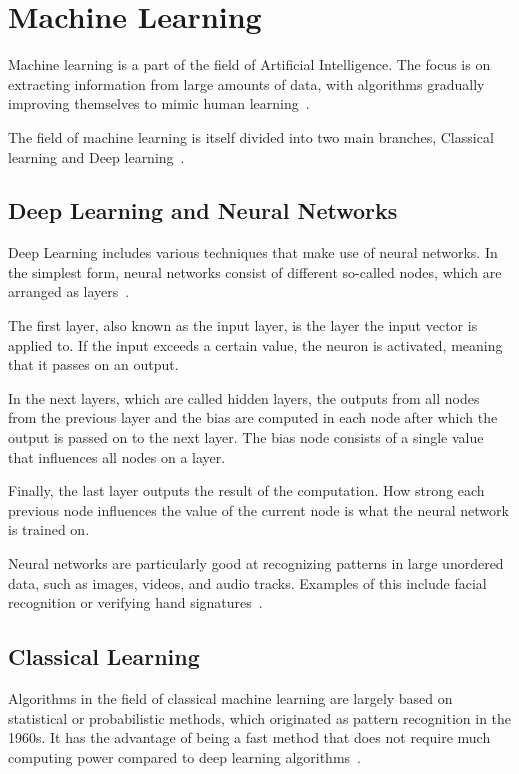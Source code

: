 \section{Machine Learning}\label{sec:machine_learning}
Machine learning is a part of the field of Artificial Intelligence. The focus is on extracting information from large amounts of data, with algorithms gradually improving themselves to mimic human learning~\cite{what-is-ml}.

The field of machine learning is itself divided into two main branches, Classical learning and Deep learning~\cite{ml-visual-explanation}.


\subsection{Deep Learning and Neural Networks}

Deep Learning includes various techniques that make use of neural networks. In the simplest form, neural networks consist of different so-called nodes, which are arranged as layers~\cite{neuralNet}.

The first layer, also known as the input layer, is the layer the input vector is applied to. If the input exceeds a certain value, the neuron is activated, meaning that it passes on an output.

In the next layers, which are called hidden layers, the outputs from all nodes from the previous layer and the bias are computed in each node after which the output is passed on to the next layer. The bias node consists of a single value that influences all nodes on a layer.

Finally, the last layer outputs the result of the computation. How strong each previous node influences the value of the current node is what the neural network is trained on.

Neural networks are particularly good at recognizing patterns in large unordered data, such as images, videos, and audio tracks. Examples of this include facial recognition or verifying hand signatures~\cite{neuralNet-applications}.



\subsection{Classical Learning} %
Algorithms in the field of classical machine learning are largely based on statistical or probabilistic methods, which originated as pattern recognition in the 1960s. It has the advantage of being a fast method that does not require much computing power compared to deep learning algorithms~\cite{classical-ml}.


